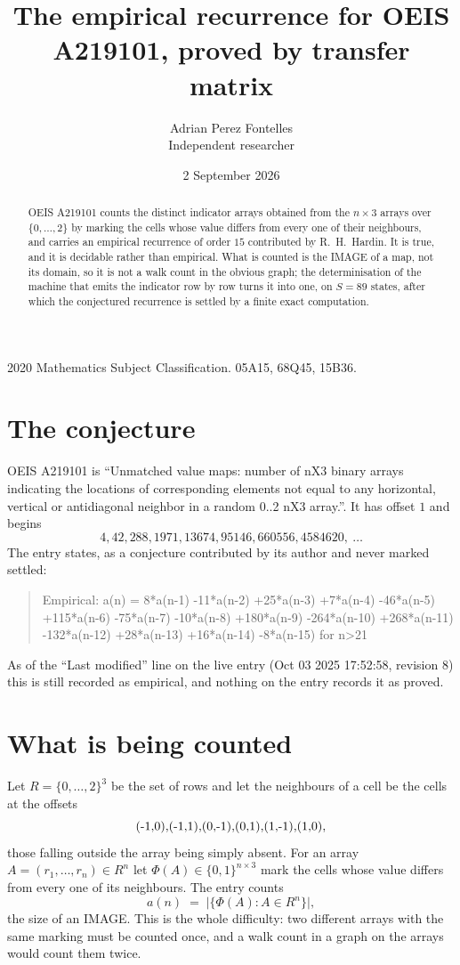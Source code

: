 \documentclass[11pt,a4paper]{article}
\title{The empirical recurrence for OEIS A219101, proved by transfer matrix}
\author{Adrian Perez Fontelles\\ \small Independent researcher}
\date{2 September 2026}
\theoremstyle{plain}
\theoremstyle{definition}
\begin{document}
\maketitle

\begin{abstract}
OEIS A219101 counts the distinct indicator arrays obtained from the $n\times3$ arrays over
$\{0,\dots,2\}$ by marking the cells whose value differs from every one of their neighbours, and carries an
empirical recurrence of order $15$ contributed by R.~H.~Hardin. It is true, and it is
decidable rather than empirical. What is counted is the IMAGE of a map, not its domain, so it
is not a walk count in the obvious graph; the determinisation of the machine that emits the
indicator row by row turns it into one, on $S=89$ states, after which the conjectured
recurrence is settled by a finite exact computation.
\end{abstract}

\noindent\small 2020 Mathematics Subject Classification. 05A15, 68Q45, 15B36.\normalsize

\section{The conjecture}

OEIS A219101 is ``Unmatched value maps: number of nX3 binary arrays indicating the locations of corresponding elements not equal to any horizontal, vertical or antidiagonal neighbor in a random 0..2 nX3 array.''. It has offset $1$ and begins
\[
4, 42, 288, 1971, 13674, 95146, 660556, 4584620,\ \dots
\]
The entry states, as a conjecture contributed by its author and never marked settled:
\begin{quote}
Empirical: a(n) = 8*a(n-1) -11*a(n-2) +25*a(n-3) +7*a(n-4) -46*a(n-5) +115*a(n-6) -75*a(n-7) -10*a(n-8) +180*a(n-9) -264*a(n-10) +268*a(n-11) -132*a(n-12) +28*a(n-13) +16*a(n-14) -8*a(n-15) for n>21
\end{quote}
As of the ``Last modified'' line on the live entry (Oct 03 2025 17:52:58, revision 8) this is still
recorded as empirical, and nothing on the entry records it as proved.

\section{What is being counted}

Let $R=\{0,\dots,2\}^{3}$ be the set of rows and let the neighbours of a cell be the
cells at the offsets
\[
$(-1,0)$, $(-1,1)$, $(0,-1)$, $(0,1)$, $(1,-1)$, $(1,0)$,
\]
those falling outside the array being simply absent. For an array
$A=(r_1,\dots,r_n)\in R^n$ let $\Phi(A)\in\{0,1\}^{n\times3}$ mark the cells whose value
differs from every one of its neighbours. The entry counts
\[
a(n)\;=\;\bigl|\{\Phi(A):A\in R^n\}\bigr| ,
\]
the size of an IMAGE. This is the whole difficulty: two different arrays with the same marking
must be counted once, and a walk count in a graph on the arrays would count them twice.
\end{document}
